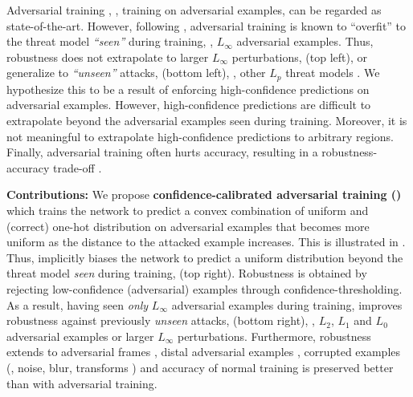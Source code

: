 Adversarial training \citep{GoodfellowICLR2015,MadryICLR2018}, \ie, training on adversarial examples, can be regarded as state-of-the-art. However, following , adversarial training is known to ``overfit'' to the threat model \emph{``seen''} during training, \eg, $L_\infty$ adversarial examples.
Thus, robustness does not extrapolate to larger $L_\infty$ perturbations, \cf {} (top left), or generalize to \emph{``unseen''} attacks, \cf {} (bottom left), \eg, other $L_p$ threat models \citep{SharmaICLRWORK2018,TramerNIPS2019,LiARXIV2019,KangARXIV2019,MainiICML2020}.
We hypothesize this to be a result of enforcing high-confidence predictions on adversarial examples. However, high-confidence predictions are difficult to extrapolate beyond the adversarial examples seen during training. Moreover, it is not meaningful to extrapolate high-confidence predictions to arbitrary regions.
Finally, adversarial training often hurts accuracy, resulting in a robustness-accuracy trade-off \citep{TsiprasICLR2019,StutzCVPR2019,RaghunathanARXIV2019,ZhangICML2019}.

\textbf{Contributions:}
%
We propose \textbf{confidence-calibrated adversarial training (\ConfTrain)} which trains the network to predict a convex combination of uniform and (correct) one-hot distribution on adversarial examples that becomes more uniform as the distance to the attacked example increases. This is illustrated in . Thus, \ConfTrain implicitly biases the network to predict a uniform distribution beyond the threat model \emph{seen} during training, \cf {} (top right). Robustness is obtained by rejecting low-confidence (adversarial) examples through confidence-thresholding. As a result, having seen \emph{only} $L_\infty$ adversarial examples during training, \ConfTrain improves robustness against previously \emph{unseen} attacks, \cf {} (bottom right), \eg, $L_2$, $L_1$ and $L_0$ adversarial examples or larger $L_\infty$ perturbations. Furthermore, robustness extends to adversarial frames \cite{ZajaxAAAIWORK2019}, distal adversarial examples \cite{HeinCVPR2019}, corrupted examples (\eg, noise, blur, transforms \etc) and accuracy of normal training is preserved better than with adversarial training.

